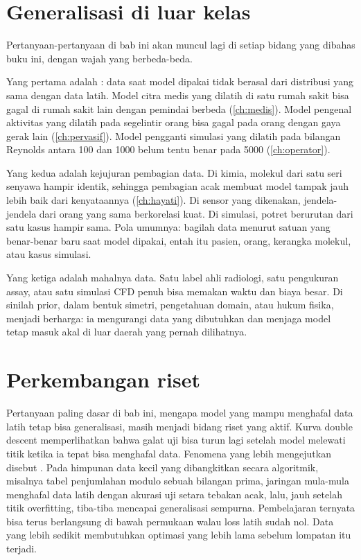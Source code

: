 \section{Generalisasi di luar kelas}

Pertanyaan-pertanyaan di bab ini akan muncul lagi di setiap bidang yang dibahas buku ini, dengan
wajah yang berbeda-beda.

Yang pertama adalah : data saat model dipakai tidak berasal dari distribusi
yang sama dengan data latih. Model citra medis yang dilatih di satu rumah sakit bisa gagal di rumah
sakit lain dengan pemindai berbeda (\cref{ch:medis}). Model pengenal aktivitas yang dilatih pada
segelintir orang bisa gagal pada orang dengan gaya gerak lain (\cref{ch:pervasif}). Model pengganti
simulasi yang dilatih pada bilangan Reynolds antara 100 dan 1000 belum tentu benar pada 5000
(\cref{ch:operator}).

Yang kedua adalah kejujuran pembagian data. Di kimia, molekul dari satu seri senyawa hampir identik,
sehingga pembagian acak membuat model tampak jauh lebih baik dari kenyataannya (\cref{ch:hayati}). Di
sensor yang dikenakan, jendela-jendela dari orang yang sama berkorelasi kuat. Di simulasi, potret
berurutan dari satu kasus hampir sama. Pola umumnya: bagilah data menurut satuan yang benar-benar baru
saat model dipakai, entah itu pasien, orang, kerangka molekul, atau kasus simulasi.

Yang ketiga adalah mahalnya data. Satu label ahli radiologi, satu pengukuran assay, atau satu simulasi
CFD penuh bisa memakan waktu dan biaya besar. Di sinilah prior, dalam bentuk simetri, pengetahuan
domain, atau hukum fisika, menjadi berharga: ia mengurangi data yang dibutuhkan dan menjaga model
tetap masuk akal di luar daerah yang pernah dilihatnya.

\section{Perkembangan riset}

Pertanyaan paling dasar di bab ini, mengapa model yang mampu menghafal data latih tetap bisa generalisasi, masih
menjadi bidang riset yang aktif. Kurva double descent \citep{belkin2019} memperlihatkan bahwa galat uji bisa turun lagi
setelah model melewati titik ketika ia tepat bisa menghafal data. Fenomena yang lebih mengejutkan disebut
 \citep{power2022}. Pada himpunan data kecil yang dibangkitkan secara algoritmik, misalnya tabel
penjumlahan modulo sebuah bilangan prima, jaringan mula-mula menghafal data latih dengan akurasi uji setara tebakan
acak, lalu, jauh setelah titik overfitting, tiba-tiba mencapai generalisasi sempurna. Pembelajaran ternyata bisa terus
berlangsung di bawah permukaan walau loss latih sudah nol. Data yang lebih sedikit membutuhkan optimasi yang lebih lama
sebelum lompatan itu terjadi.

